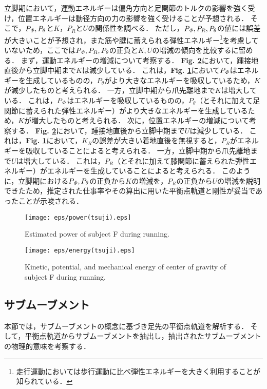 立脚期において，運動エネルギーは偏角方向と足関節のトルクの影響を強く受け，位置エネルギーは動径方向の力の影響を強く受けることが予想される．
そこで，$P_{\it \Phi},P_{\theta}$と$K$，$P_R$と$U$の関係性を調べる．
ただし，$P_{\it \Phi},P_R,P_{\theta}$の値には誤差が大きいことが予想され，また筋や腱に蓄えられる弾性エネルギー\footnote{走行運動においては歩行運動に比べ弾性エネルギーを大きく利用することが知られている．}を考慮していないため，ここでは$P_{\it \Phi},P_R,P_{\theta}$の正負と$K,U$の増減の傾向を比較するに留める．
まず，運動エネルギーの増減について考察する．
{\bf Fig. \ref{energy(tsuji)}}において，踵接地直後から立脚中期まで$K$は減少している．
これは，{\bf Fig. \ref{power(tsuji)}}において$P_{\it \Phi}$はエネルギーを生成しているものの，$P_{\theta}$がより大きなエネルギーを吸収しているため，$K$が減少したものと考えられる．
一方，立脚中期から爪先離地まで$K$は増大している．
これは，$P_{\it \Phi}$はエネルギーを吸収しているものの，$P_{\theta}$（とそれに加えて足関節に蓄えられた弾性エネルギー）がより大きなエネルギーを生成しているため，$K$が増大したものと考えられる．
次に，位置エネルギーの増減について考察する．
{\bf Fig. \ref{energy(tsuji)}}において，踵接地直後から立脚中期まで$U$は減少している．
これは，{\bf Fig. \ref{power(tsuji)}}において，$K_R$の誤差が大きい着地直後を無視すると，$P_R$がエネルギーを吸収していることによると考えられる．
一方，立脚中期から爪先離地まで$U$は増大している．
これは，$P_R$（とそれに加えて膝関節に蓄えられた弾性エネルギー）がエネルギーを生成していることによると考えられる．
このように，立脚期における$P_{\it \Phi},P_{\theta}$の正負から$K$の増減を，$P_R$の正負から$U$の増減を説明できたため，推定された仕事率やその算出に用いた平衡点軌道と剛性が妥当であったことが示唆される．
\clearpage
%
\begin{figure}[!t]
 \begin{center}
  \texttt{[image: eps/power(tsuji).eps]}
  \caption{Estimated power of subject F during running.}
  \label{power(tsuji)}
 \end{center}
\end{figure}
%
\begin{figure}[!t]
 \begin{center}
  \texttt{[image: eps/energy(tsuji).eps]}
  \caption{Kinetic, potential, and mechanical energy of center of gravity of subject F during running.}
  \label{energy(tsuji)}
 \end{center}
\end{figure}
%
\clearpage
\subsection{サブムーブメント}
本節では，サブムーブメントの概念に基づき足先の平衡点軌道を解析する．
そして，平衡点軌道からサブムーブメントを抽出し，抽出されたサブムーブメントの物理的意味を考察する．

